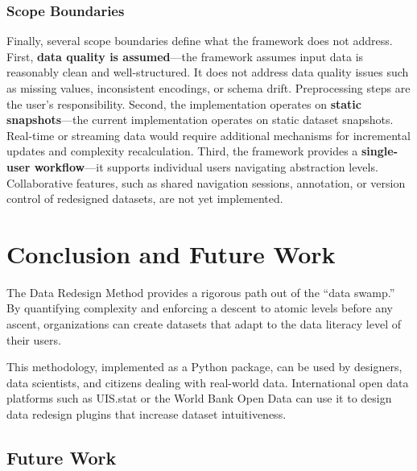 \documentclass[Afour,times,sageh]{sagej}
\begin{document}
\subsubsection{Scope Boundaries}

Finally, several scope boundaries define what the framework does not address. First, \textbf{data quality is assumed}---the framework assumes input data is reasonably clean and well-structured. It does not address data quality issues such as missing values, inconsistent encodings, or schema drift. Preprocessing steps are the user's responsibility. Second, the implementation operates on \textbf{static snapshots}---the current implementation operates on static dataset snapshots. Real-time or streaming data would require additional mechanisms for incremental updates and complexity recalculation. Third, the framework provides a \textbf{single-user workflow}---it supports individual users navigating abstraction levels. Collaborative features, such as shared navigation sessions, annotation, or version control of redesigned datasets, are not yet implemented.

\section{Conclusion and Future Work}
\label{sec:conclusion}

\noindent The Data Redesign Method provides a rigorous path out of the ``data swamp.'' By quantifying complexity and enforcing a descent to atomic levels before any ascent, organizations can create datasets that adapt to the data literacy level of their users.

\vspace{1em}

\noindent This methodology, implemented as a Python package, can be used by designers, data scientists, and citizens dealing with real-world data. International open data platforms such as UIS.stat or the World Bank Open Data can use it to design data redesign plugins that increase dataset intuitiveness.

\subsection{Future Work}

\end{document}
